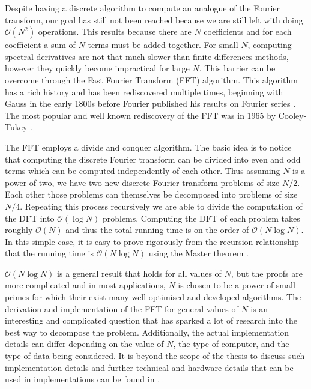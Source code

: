 Despite having a discrete algorithm to compute an analogue of the Fourier transform, our goal has still not been reached because we are still left with doing $\mathcal{O}(N^{2})$ operations. This results because there are $N$ coefficients and for each coefficient a sum of $N$ terms must be added together. For small $N$, computing spectral derivatives are not that much slower than finite differences methods, however they quickly become impractical for large $N$. This barrier can be overcome through the Fast Fourier Transform (FFT) algorithm. This algorithm has a rich history and has been rediscovered multiple times, beginning with Gauss in the early 1800s before Fourier published his results on Fourier series \cite{kammler}. The most popular and well known rediscovery of the FFT was in 1965 by Cooley-Tukey \cite{cooley1965}.

The FFT employs a divide and conquer algorithm. The basic idea is to notice that computing the discrete Fourier transform can be divided into even and odd terms which can be computed independently of each other. Thus assuming $N$ is a power of two, we have two new discrete Fourier transform problems of size $N/2$. Each other those problems can themselves be decomposed into problems of size $N/4$. Repeating this process recursively we are able to divide the computation of the DFT into $\mathcal{O}(\log N)$ problems. Computing the DFT of each problem takes roughly $\mathcal{O}(N)$ and thus the total running time is on the order of $\mathcal{O}(N\log N)$. In this simple case, it is easy to prove rigorously from the recursion relationship that the running time is $\mathcal{O}(N\log N)$ using the Master theorem \cite{clrs}.

$\mathcal{O}(N\log N)$ is a general result that holds for all values of $N$, but the proofs are more complicated and in most applications, $N$ is chosen to be a power of small primes for which their exist many well optimised and developed algorithms. The derivation and implementation of the FFT for general values of $N$ is an interesting and complicated question that has sparked a lot of research into the best way to decompose the problem. Additionally, the actual implementation details can differ depending on the value of $N$, the type of computer, and the type of data being considered. It is beyond the scope of the thesis to discuss such implementation details and further technical and hardware details that can be used in implementations can be found in \cite{fftw}.

